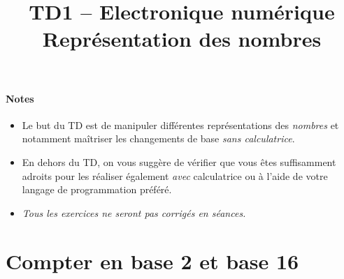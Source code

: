 \documentclass[a4paper,11pt]{article}
\title{{\Huge TD1 -- Electronique numérique}\\Représentation des nombres}
\date{}
\begin{document}
\maketitle

\paragraph{Notes}
\begin{itemize}
  \item Le but du TD est de manipuler  différentes représentations des \textit{nombres} et notamment maîtriser les changements de base \textit{sans calculatrice}.
  \item En dehors du TD, on vous suggère de vérifier que vous êtes suffisamment adroits pour les réaliser également \textit{avec} calculatrice ou à l'aide de votre langage de programmation préféré.
  \item \textit{Tous les exercices ne seront pas corrigés en séances.}
\end{itemize}

\section{Compter en base 2 et base 16}
\end{document}
